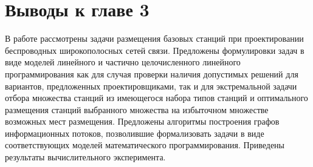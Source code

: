 
\section{Выводы к главе 3}
В работе рассмотрены задачи размещения базовых станций при проектировании беспроводных широкополосных сетей связи. Предложены формулировки задач в виде   моделей линейного и частично целочисленного линейного программирования как для случая проверки  наличия допустимых решений для вариантов, предложенных проектировщиками, так и для экстремальной задачи отбора множества станций из имеющегося набора типов станций и оптимального размещения станций выбранного множества на избыточном множестве возможных мест размещения. Предложены алгоритмы построения графов информационных потоков, позволившие формализовать задачи в виде соответствующих моделей математического программирования. Приведены результаты вычислительного эксперимента.


















